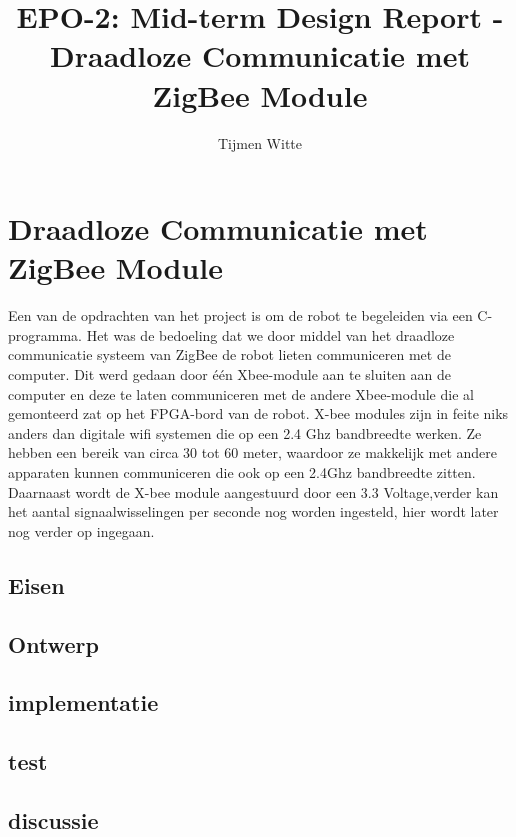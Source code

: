\documentclass{report}
\title{EPO-2: Mid-term Design Report - Draadloze Communicatie met ZigBee Module}
\author{Tijmen Witte}
\begin{document}
\chapter{Draadloze Communicatie met ZigBee Module}
\label{ch:probleem}
Een van de opdrachten van het project is om de robot te begeleiden via een C-programma. Het was de bedoeling dat we door middel van het draadloze communicatie systeem van ZigBee de robot lieten communiceren met de computer. Dit werd gedaan door één Xbee-module aan te sluiten aan de computer en deze te laten communiceren met de andere Xbee-module die al gemonteerd zat op het FPGA-bord van de robot.
\newline
\newline
X-bee modules zijn in feite niks anders dan digitale wifi systemen die op een 2.4 Ghz bandbreedte werken. Ze hebben een bereik van circa 30 tot 60 meter, waardoor ze makkelijk met andere apparaten kunnen communiceren die ook op een 2.4Ghz bandbreedte zitten. Daarnaast wordt de X-bee module aangestuurd door een 3.3 Voltage,verder kan het aantal signaalwisselingen per seconde nog worden ingesteld, hier wordt later nog verder op ingegaan.





\section{Eisen}

\section{Ontwerp}

\section{implementatie}

\section{test}

\section{discussie}
\end{document}
